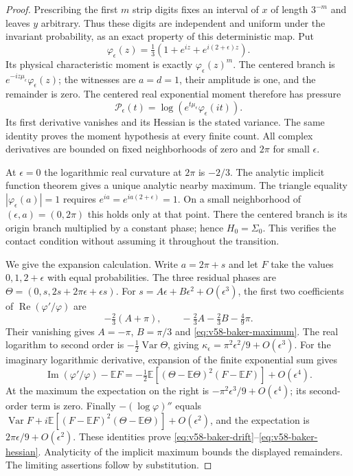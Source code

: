 \begin{proof}
Prescribing the first $m$ strip digits fixes an interval of $x$ of
length $3^{-m}$ and leaves $y$ arbitrary. Thus these digits are
independent and uniform under the invariant probability, as an exact
property of this deterministic map. Put
\[
 \varphi_\epsilon(z)=\tfrac13
                (1+e^{iz}+e^{i(2+\epsilon)z}).
\]
Its physical characteristic moment is exactly
$\varphi_\epsilon(z)^m$. The centered branch is
$e^{-iz\mu_\epsilon}\varphi_\epsilon(z)$; the witnesses are
$a=d=1$, their amplitude is one, and the remainder is zero.
The centered real exponential moment therefore has pressure
\[
 \mathscr P_\epsilon(t)=
           \log(e^{t\mu_\epsilon}\varphi_\epsilon(it)).
\]
Its first derivative vanishes and its Hessian is the stated variance.
The same identity proves the moment hypothesis at every finite count.
All complex derivatives are bounded on fixed neighborhoods of zero
and $2\pi$ for small $\epsilon$.

At $\epsilon=0$ the logarithmic real curvature at $2\pi$ is $-2/3$.
The analytic implicit function theorem gives a unique analytic nearby
maximum. The triangle equality $|\varphi_\epsilon(a)|=1$ requires
$e^{ia}=e^{ia(2+\epsilon)}=1$. On a small neighborhood of
$(\epsilon,a)=(0,2\pi)$ this holds only at that point. There the
centered branch is its origin branch multiplied by a constant phase;
hence $H_0=\Sigma_0$. This verifies the contact condition without
assuming it throughout the transition.

We give the expansion calculation. Write $a=2\pi+s$ and let
$F$ take the values $0,1,2+\epsilon$ with equal probabilities.
The three residual phases are
$\Theta=(0,s,2s+2\pi\epsilon+\epsilon s)$. For
$s=A\epsilon+B\epsilon^2+O(\epsilon^3)$, the first two coefficients
of $\operatorname{Re}(\varphi'/\varphi)$ are
\[
 -\tfrac23(A+\pi),\qquad
 -\tfrac23A-\tfrac23B-\tfrac49\pi.
\]
Their vanishing gives $A=-\pi$, $B=\pi/3$ and
\eqref{eq:v58-baker-maximum}. The real logarithm to second order is
$-\tfrac12\operatorname{Var}\Theta$, giving
$\kappa_\epsilon=\pi^2\epsilon^2/9+O(\epsilon^3)$.
For the imaginary logarithmic derivative, expansion of the finite
exponential sum gives
\[
 \operatorname{Im}(\varphi'/\varphi)-\mathbb EF
 =-\tfrac12\mathbb E[(\Theta-\mathbb E\Theta)^2
                                    (F-\mathbb EF)]+O(\epsilon^4).
\]
At the maximum the expectation on the right is
$-\pi^2\epsilon^3/9+O(\epsilon^4)$; its second-order term is zero.
Finally $-(\log\varphi)''$ equals
$\operatorname{Var}F+i\mathbb E[(F-\mathbb EF)^2
(\Theta-\mathbb E\Theta)]+O(\epsilon^2)$, and the expectation is
$2\pi\epsilon/9+O(\epsilon^2)$. These identities prove
\eqref{eq:v58-baker-drift}--\eqref{eq:v58-baker-hessian}. Analyticity
of the implicit maximum bounds the displayed remainders. The limiting
assertions follow by substitution.
\end{proof}

